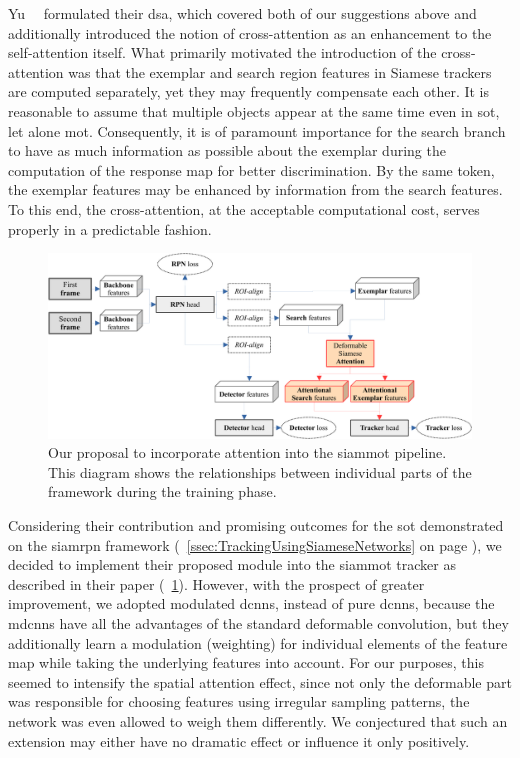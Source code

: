 Yu~\etal{}~\cite{yu2021dsa} formulated their \gls{dsa}, which covered both of our suggestions above and additionally introduced the notion of cross-attention as an enhancement to the self-attention itself. What primarily motivated the introduction of the cross-attention was that the exemplar and search region features in Siamese trackers are computed separately, yet they may frequently compensate each other. It is reasonable to assume that multiple objects appear at the same time even in \gls{sot}, let alone \gls{mot}. Consequently, it is of paramount importance for the search branch to have as much information as possible about the exemplar during the computation of the response map for better discrimination. By the same token, the exemplar features may be enhanced by information from the search features. To this end, the cross-attention, at the acceptable computational cost, serves properly in a predictable fashion.

\begin{figure}[t]
    \centerline{\includegraphics[width=\linewidth]{figures/siamese_tracking/siammot_attention_training.pdf}}
    \caption[\gls{siammot} with attention]{Our proposal to incorporate attention into the \gls{siammot} pipeline. This diagram shows the relationships between individual parts of the framework during the training phase.}
    \label{fig:SiamMOTWithAttention}
\end{figure}

Considering their contribution and promising outcomes for the \gls{sot} demonstrated on the \gls{siamrpn} framework (\sectiontext{}~\ref{ssec:TrackingUsingSiameseNetworks} on page \pageref{ssec:TrackingUsingSiameseNetworks}), we decided to implement their proposed module into the \gls{siammot} tracker as described in their paper (\figtext{}~\ref{fig:SiamMOTWithAttention}). However, with the prospect of greater improvement, we adopted modulated \glspl{dcnn}, instead of pure \glspl{dcnn}, because the \glspl{mdcnn} have all the advantages of the standard deformable convolution, but they additionally learn a modulation (weighting) for individual elements of the feature map while taking the underlying features into account. For our purposes, this seemed to intensify the spatial attention effect, since not only the deformable part was responsible for choosing features using irregular sampling patterns, the network was even allowed to weigh them differently. We conjectured that such an extension may either have no dramatic effect or influence it only positively.

